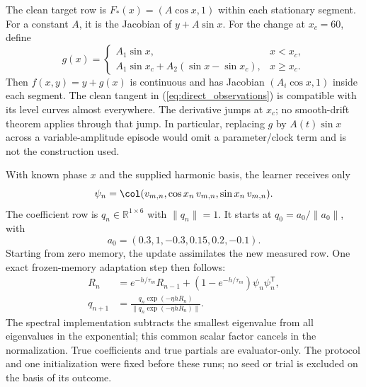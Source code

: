 The clean target row is $F_*(x)=(A\cos x,1)$ within each stationary
segment. For a constant $A$, it is the Jacobian of $y+A\sin x$. For the
change at $x_c=60$, define
\begin{equation}
 g(x)=\begin{cases}
 A_1\sin x,&x<x_c,\\
 A_1\sin x_c+A_2(\sin x-\sin x_c),&x\ge x_c.
 \end{cases}
 \label{eq:direct_piecewise_level}
\end{equation}
Then $f(x,y)=y+g(x)$ is continuous and has Jacobian $(A_i\cos x,1)$
inside each segment. The clean tangent in (\ref{eq:direct_observations})
is compatible with its level curves almost everywhere. The derivative
jumps at $x_c$; no smooth-drift theorem applies through that jump.
In particular, replacing $g$ by $A(t)\sin x$ across a variable-amplitude
episode would omit a parameter/clock term and is not the construction used.

With known phase $x$ and the supplied harmonic basis, the learner receives
only
\begin{equation}
 \psi_n=\col(v_{m,n},\cos x_n\,v_{m,n},\sin x_n\,v_{m,n}).
 \label{eq:direct_lift}
\end{equation}
The coefficient row is $q_n\in\mathbb R^{1\times6}$ with $\|q_n\|=1$.
It starts at $q_0=a_0/\|a_0\|$, with
\begin{equation*}
 a_0=(0.3,1,-0.3,0.15,0.2,-0.1).
\end{equation*}
Starting from zero memory, the update assimilates the new measured row.
One exact frozen-memory adaptation
step then follows:
\begin{align}
 R_n&=e^{-h/\tau_m}R_{n-1}+(1-e^{-h/\tau_m})\psi_n\psi_n^{\mathsf T},\\
 q_{n+1}&=\frac{q_n\exp(-\eta hR_n)}{\|q_n\exp(-\eta hR_n)\|}.
 \label{eq:direct_step}
\end{align}
The spectral implementation subtracts the smallest eigenvalue from all
eigenvalues in the exponential; this common scalar factor cancels in the
normalization. True coefficients and true partials are evaluator-only.
The protocol and one initialization were fixed before these runs; no
seed or trial is excluded on the basis of its outcome.

